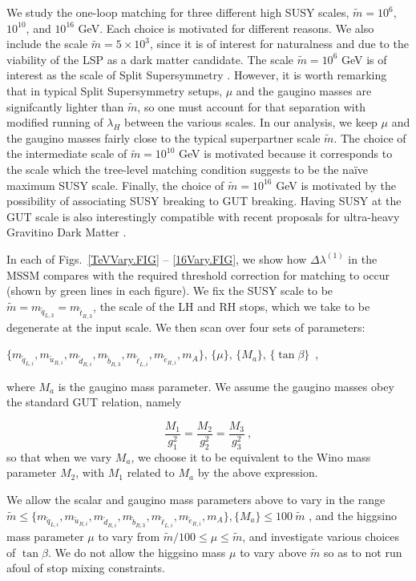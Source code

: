 \documentclass[12pt]{article}
\newcommand{\beq}{\begin{equation}}
\newcommand{\eeq}{\end{equation}}
\newcommand{\sq}{\tilde{q}}
\newcommand{\mStL}{m_{\sq_{L,3}}}
\newcommand{\mSqL}{m_{\sq_{L,i}}}
\newcommand{\mStR}{m_{\tilde{t}_{R,3}}}
\newcommand{\mSbR}{m_{\tilde{b}_{R,3}}}
\newcommand{\mSuR}{m_{\tilde{u}_{R,i}}}
\newcommand{\mSdR}{m_{\tilde{d}_{R,i}}}
\newcommand{\mSeR}{m_{\tilde{e}_{R,i}}}
\newcommand{\mSlL}{m_{\tilde{\ell}_{L,i}}}
\newcommand{\mS}{\tilde{m}}
\begin{document}
We study the one-loop matching for three different high SUSY scales, $\mS = 10^{6}$, $10^{10}$, and $10^{16}$ GeV. Each choice is motivated for different reasons. We also include the scale $\mS=5\times10^3$, since it is of interest for naturalness and due to the viability of the LSP as a dark matter candidate. The scale $\mS=10^6$ GeV is of interest as the scale of Split Supersymmetry \cite{Wells:2003tf, ArkaniHamed:2004fb, Giudice:2004tc, ArkaniHamed:2004yi, Wells:2004di}.
However, it is worth remarking that in typical Split Supersymmetry setups, $\mu$ and the gaugino masses are signifcantly lighter than $\mS$, so one must account for that separation with modified running of $\lambda_H$ between the various scales. In our analysis, we keep $\mu$ and the gaugino masses fairly close to the typical superpartner scale $\mS$. 
The choice of the intermediate scale of $\mS=10^{10}$ GeV is motivated because it corresponds to the scale which the tree-level matching condition suggests to be the na\"ive maximum SUSY scale. Finally, the choice of $\mS=10^{16}$ GeV is motivated by the possibility of associating SUSY breaking to GUT breaking. Having SUSY at the GUT scale is also interestingly compatible with recent proposals for ultra-heavy Gravitino Dark Matter \cite{Benakli:2017whb, Dudas:2017rpa}. 


In each of Figs.~\ref{TeVVary.FIG} -- \ref{16Vary.FIG}, we show how $\Delta\lambda^{(1)}$ in the MSSM compares with the required threshold correction for matching to occur (shown by green lines in each figure). We fix the SUSY scale to be $\mS=\mStL=\mStR$, the scale of the LH and RH stops, which we take to be degenerate at the input scale. We then scan over four sets of parameters: \\
\begin{center}
\vspace{-0.25in}
$\{\mSqL, \mSuR, \mSdR,\mSbR, \mSlL, \mSeR, m_A \}$, $\{\mu \}$, $\{M_a\}$, $\{\tan\beta\}$\ ,
\vspace{0.1in}
\end{center}
where $M_a$ is the gaugino mass parameter. We assume the gaugino masses obey the standard GUT relation, namely

\beq
\frac{M_1}{g_1^2} = \frac{M_2}{g_2^2} = \frac{M_3}{g_3^2} \ ,
\label{GUTrelation.EQ}
\eeq 
so that when we vary $M_a$, we choose it to be equivalent to the Wino mass parameter $M_2$, with $M_1$ related to $M_a$ by the above expression.

We allow the scalar and gaugino mass parameters above to vary in the range $\mS \leq \{\mSqL, \mSuR, \mSdR,\mSbR, \mSlL, \mSeR, m_A \},\{M_a \} \leq 100\ \mS$ , and the higgsino mass parameter $\mu$ to vary from  $\mS /  100 \leq \mu \leq \mS$, and investigate various choices of $\tan\beta$. We do not allow the higgsino mass $\mu$ to vary above $\mS$ so as to not run afoul of stop mixing constraints.
\end{document}
